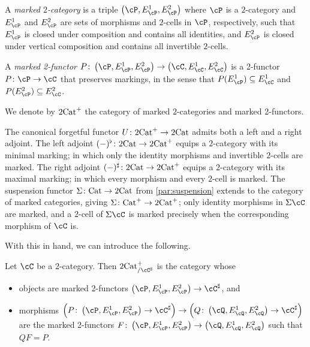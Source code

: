 \documentclass[11pt, dvipsnames]{amsart}
\begin{document}
	\begin{defn}\label{Def:marked-cat}
		A \emph{marked $2$-category} is a triple $\markedscat{\cP}$ where $\cP$ is a $2$-category and $E^1_{\cP}$ and $E^2_{\cP}$ are sets of morphisms and $2$-cells in $\cP$, respectively, such that $E^1_{\cP}$ is closed under composition and contains all identities, and $E^2_{\cP}$ is closed under vertical composition and contains all invertible $2$-cells.
		
		A \emph{marked 2-functor} $P\colon \markedscat{\cP}\to \markedscat{\cC}$ is a 2-functor $P\colon\cP \to \cC$ that preserves markings, in the sense that $P(E^1_{\cP})\subseteq E^1_{\cC}$ and $P(E^2_{\cP})\subseteq E^2_{\cC}$. 
        
        We denote by $2\mathrm{Cat}^{+}$ the category of marked $2$-categories and marked 2-functors.
	\end{defn}


	\begin{rmk}\label{rmk:forgetful-marked}
		The canonical forgetful functor $U\colon 2\mathrm{Cat}^{+}\to 2\mathrm{Cat}$ admits both a left and a right adjoint. The left adjoint $(-)^{\flat}\colon 2\mathrm{Cat} \to 2\mathrm{Cat}^{+}$ equips a $2$-category with its minimal marking; in which only the identity morphisms and invertible $2$-cells are marked. The right adjoint $(-)^{\sharp}\colon 2\mathrm{Cat} \to 2\mathrm{Cat}^{+}$ equips a $2$-category with its maximal marking; in which every morphism and every $2$-cell is marked. The suspension functor $\Sigma\colon \mathrm{Cat} \to 2\mathrm{Cat}$ from \cref{par:suspension} extends to the category of marked categories, giving $\Sigma\colon \mathrm{Cat}^{+}\to 2\mathrm{Cat}^{+}$; only identity morphisms in $\Sigma\cC$ are marked, and a $2$-cell of $\Sigma\cC$ is marked precisely when the corresponding morphism of $\cC$ is.
	\end{rmk}

    With this in hand, we can introduce the following.

	\begin{defn}\label{Def:2Cat-over-C-sharp}
		Let $\cC$ be a $2$-category. Then $\twocat^{+}_{/\cC^\sharp}$ is the category whose
		\begin{itemize}
			\item \label{Def:2Cat-over-C-sharp.1} objects are marked 2-functors $\markedscat{\cP}\to \Csharp$, and 
			\item \label{Def:2Cat-over-C-sharp.2} morphisms $\left( P\colon\markedscat{\cP}\to \Csharp\right) \to \left( Q\colon \markedscat{\cQ}\to \Csharp\right)$ are the marked 2-functors $F\colon \markedscat{\cP}\to \markedscat{\cQ}$ such that $QF=P$. 
		\end{itemize}
	\end{defn}
\end{document}
